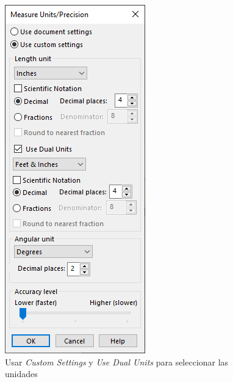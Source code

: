 \documentclass{report}
\begin{document}
\begin{figure}[H]
	\centering
	\includegraphics[width=0.85\linewidth, height=0.5\textheight,keepaspectratio]{Imagenes/solidworks_dual_units02}
	\caption{Usar \emph{Custom Settings} y \emph{Use Dual Units} para seleccionar las unidades}
	\label{fig:solidworksdualunits02}
\end{figure}
\end{document}
